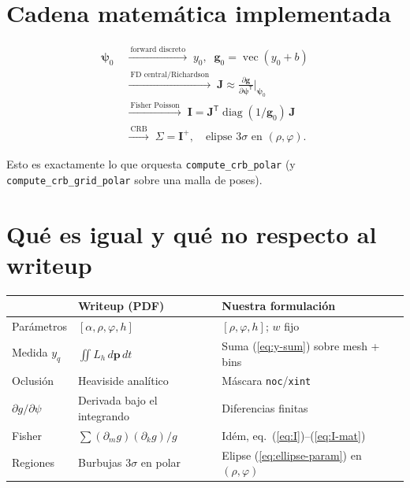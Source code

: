 \documentclass[11pt,a4paper]{article}
\theoremstyle{definition}
\newcommand{\vect}[1]{\boldsymbol{#1}}
\newcommand{\matr}[1]{\mathbf{#1}}
\DeclareMathOperator{\diag}{diag}
\begin{document}
\section{Cadena matem\'atica implementada}
\label{sec:cadena}

\begin{equation}
\begin{aligned}
    \vect{\psi}_0
    &\;\xrightarrow{\ \text{forward discreto}\ }\;
    y_0,\;\;
    \vect{g}_0=\operatorname{vec}(y_0+b) \\[4pt]
    &\;\xrightarrow{\ \text{FD central/Richardson}\ }\;
    \matr{J}
    \approx
    \frac{\partial\vect{g}}{\partial\vect{\psi}^{\mathsf T}}
    \Big|_{\vect{\psi}_0} \\[4pt]
    &\;\xrightarrow{\ \text{Fisher Poisson}\ }\;
    \matr{I}
    =
    \matr{J}^{\mathsf T}\diag(1/\vect{g}_0)\,\matr{J} \\[4pt]
    &\;\xrightarrow{\ \text{CRB}\ }\;
    \Sigma=\matr{I}^{+},\quad
    \text{elipse }3\sigma\text{ en }(\rho,\varphi).
\end{aligned}
\label{eq:pipeline}
\end{equation}

Esto es exactamente lo que orquesta \texttt{compute\_crb\_polar}
(y \texttt{compute\_crb\_grid\_polar} sobre una malla de poses).

\section{Qu\'e es igual y qu\'e no respecto al writeup}
\label{sec:vs-pdf}

\begin{center}
\small
\begin{tabular}{@{}p{3.2cm}p{5.5cm}p{5.5cm}@{}}
\toprule
 & Writeup (PDF) & Nuestra formulaci\'on \\
\midrule
Par\'ametros &
$[\alpha,\rho,\varphi,h]$ &
$[\rho,\varphi,h]$; $w$ fijo \\
Medida $y_q$ &
$\iint L_h\,d\vect{p}\,dt$ &
Suma (\ref{eq:y-sum}) sobre mesh + bins \\
Oclusi\'on &
Heaviside anal\'itico &
M\'ascara \texttt{noc}/\texttt{xint} \\
$\partial g/\partial\psi$ &
Derivada bajo el integrando &
Diferencias finitas \\
Fisher &
$\sum (\partial_m g)(\partial_k g)/g$ &
Id\'em, eq.~(\ref{eq:I})--(\ref{eq:I-mat}) \\
Regiones &
Burbujas $3\sigma$ en polar &
Elipse (\ref{eq:ellipse-param}) en $(\rho,\varphi)$ \\
\bottomrule
\end{tabular}
\end{center}
\end{document}
